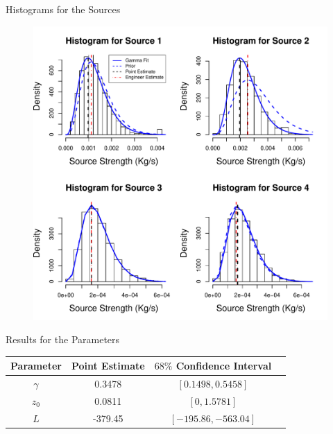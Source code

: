 \documentclass[11pt]{beamer}
\theoremstyle{plain}
\theoremstyle{definition}
\begin{document}
\begin{frame}{Histograms for the Sources}
\begin{figure}
\centering
\includegraphics[scale=0.35]{../FigChap4/histogramsII}
\end{figure}
\end{frame}



\begin{frame}{Results for the Parameters}

\begin{table}
\centering
\begin{tabular}{|c|c|c|c|}
\hline 
Parameter & Point Estimate & $68\%$ Confidence Interval\tabularnewline
\hline 
\hline 
$\gamma$ &  0.3478 & $[0.1498,0.5458]$\tabularnewline
\hline 
$z_{0}$ & 0.0811 & $[0,1.5781]$\tabularnewline
\hline 
$L$  & -379.45 & $[-195.86,-563.04]$\tabularnewline
\hline 
\end{tabular}
\end{table}

\end{frame}
\end{document}
